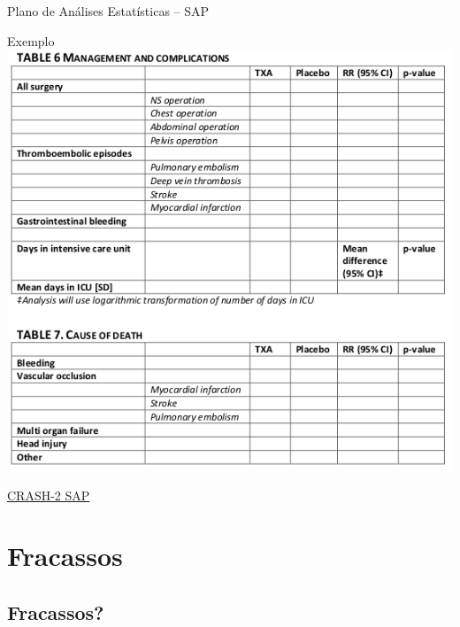 \documentclass{beamer}
\begin{document}
\begin{frame}{Plano de Análises Estatísticas -- SAP}
  \begin{exampleblock}{Exemplo}
    \centering
    \includegraphics[height=.8\textheight]{Planejamento/CRASH-SAP3}

  \end{exampleblock}
  \vfill
  \scriptsize
  \hfill \href{http://www.crash2.lshtm.ac.uk/Images/SAP.pdf}{CRASH-2 SAP}
\end{frame}

\section{Fracassos}

\subsection{Fracassos?}
\end{document}
